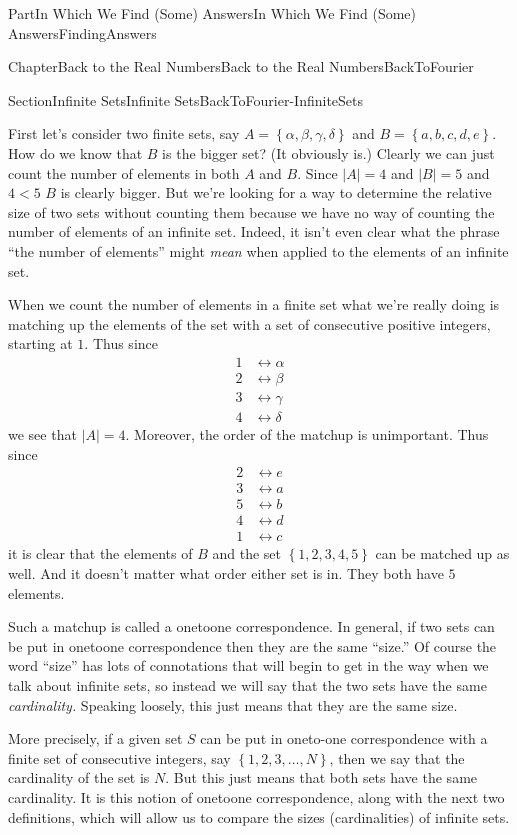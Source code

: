 \documentclass[oneside,10pt,]{book}
\numberwithin{equation}{part}
\newcommand{\abs}[1]{\left|#1\right|}
\newcommand{\lt}{<}
\newcommand{\amp}{&}
\begin{document}
\begin{partptx}{Part}{In Which We Find (Some) Answers}{}{In Which We Find (Some) Answers}{}{}{FindingAnswers}
\begin{chapterptx}{Chapter}{Back to the Real Numbers}{}{Back to the Real Numbers}{}{}{BackToFourier}
\begin{sectionptx}{Section}{Infinite Sets}{}{Infinite Sets}{}{}{BackToFourier-InfiniteSets}
\par
First let's consider two finite sets, say \(A=\left\{\alpha,\beta,\gamma,\delta\right\}\) and \(B=\left\{a,b,c,d,e\right\}\).  How do we know that \(B\) is the bigger set? (It obviously is.) Clearly we can just count the number of elements in both \(A\) and \(B\).  Since \(\abs{A}=4\) and \(\abs{B}=5\) and \(4\lt 5\) \(B\) is clearly bigger.  But we're looking for a way to determine the relative size of two sets without counting them because we have no way of counting the number of elements of an infinite set. Indeed, it isn't even clear what the phrase ``the number of elements'' might \emph{mean} when applied to the elements of an infinite set.%
\par
When we count the number of elements in a finite set what we're really doing is matching up the elements of the set with a set of consecutive positive integers, starting at \(1\).  Thus since%
\begin{align*}
1\amp \leftrightarrow\alpha\\
2\amp \leftrightarrow\beta\\
3\amp \leftrightarrow\gamma\\
4\amp \leftrightarrow\delta
\end{align*}
we see that \(\abs{A}=4\).  Moreover, the order of the match\textendash{}up is unimportant.  Thus since%
\begin{align*}
2\amp \leftrightarrow e\\
3\amp \leftrightarrow a\\
5\amp \leftrightarrow b\\
4\amp \leftrightarrow d\\
1\amp \leftrightarrow c
\end{align*}
it is clear that the elements of \(B\) and the set \(\left\{1,2,3,4,5\right\}\) can be matched up as well.  And it doesn't matter what order either set is in.  They both have \(5\) elements.%
\par
Such a match\textendash{}up is called a one\textendash{}to\textendash{}one correspondence.  In general, if two sets can be put in one\textendash{}to\textendash{}one correspondence then they are the same ``size.'' Of course the word ``size'' has lots of connotations that will begin to get in the way when we talk about infinite sets, so instead we will say that the two sets have the same \emph{cardinality.} Speaking loosely, this just means that they are the same size.%
\par
More precisely, if a given set \(S\) can be put in one\textendash{}to\textendash{}-one correspondence with a finite set of consecutive integers, say \(\left\{1,2,3,\ldots, N\right\}\), then we say that the cardinality of the set is \(N\).  But this just means that both sets have the same cardinality.  It is this notion of one\textendash{}to\textendash{}one correspondence, along with the next two definitions, which will allow us to compare the sizes (cardinalities) of infinite sets.%

\end{sectionptx}
\end{chapterptx}
\end{partptx}
\end{document}

